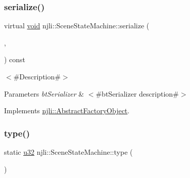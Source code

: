 \mbox{\label{classnjli_1_1_scene_state_machine_aea5cd03074546b8ffccf52936ea67e72}} 
\subsubsection{\texorpdfstring{serialize()}{serialize()}}
{\footnotesize\ttfamily virtual \mbox{\hyperlink{_thread_8h_af1e856da2e658414cb2456cb6f7ebc66}{void}} njli\+::\+Scene\+State\+Machine\+::serialize (\begin{DoxyParamCaption}\item[{\mbox{\hyperlink{_thread_8h_af1e856da2e658414cb2456cb6f7ebc66}{void}} $\ast$}]{,  }\item[{bt\+Serializer $\ast$}]{ }\end{DoxyParamCaption}) const\hspace{0.3cm}{\ttfamily [virtual]}}

$<$\#\+Description\#$>$


\begin{DoxyParams}{Parameters}
{\em bt\+Serializer} & $<$\#bt\+Serializer description\#$>$ \\
\hline
\end{DoxyParams}


Implements \mbox{\hyperlink{classnjli_1_1_abstract_factory_object_aad2fbe86fb3bdecf02918a96b9c57976}{njli\+::\+Abstract\+Factory\+Object}}.

\mbox{\label{classnjli_1_1_scene_state_machine_abca4021d6883832f287a1f259bb563a0}} 
\subsubsection{\texorpdfstring{type()}{type()}}
{\footnotesize\ttfamily static \mbox{\hyperlink{_util_8h_a10e94b422ef0c20dcdec20d31a1f5049}{u32}} njli\+::\+Scene\+State\+Machine\+::type (\begin{DoxyParamCaption}{ }\end{DoxyParamCaption})\hspace{0.3cm}{\ttfamily [static]}}

